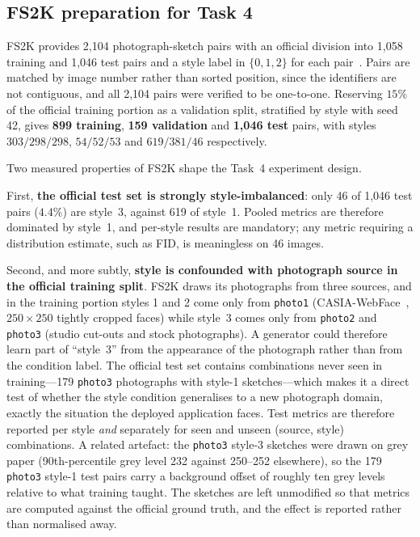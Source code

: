 \documentclass[conference]{IEEEtran}
\begin{document}
\subsection{FS2K preparation for Task 4}
\label{sec:fs2kprep}

FS2K provides 2{,}104 photograph-sketch pairs with an official division into
1{,}058 training and 1{,}046 test pairs and a style label in $\{0,1,2\}$ for each
pair~\cite{fan2022facial}. Pairs are matched by image number rather than sorted
position, since the identifiers are not contiguous, and all 2{,}104 pairs were
verified to be one-to-one. Reserving $15\%$ of the official training portion as a
validation split, stratified by style with seed 42, gives \textbf{899 training},
\textbf{159 validation} and \textbf{1{,}046 test} pairs, with styles
$303/298/298$, $54/52/53$ and $619/381/46$ respectively.

Two measured properties of FS2K shape the Task~4 experiment design.

First, \textbf{the official test set is strongly style-imbalanced}: only 46 of
1{,}046 test pairs ($4.4\%$) are style~3, against 619 of style~1. Pooled metrics
are therefore dominated by style~1, and per-style results are mandatory; any
metric requiring a distribution estimate, such as FID, is meaningless on 46
images.

Second, and more subtly, \textbf{style is confounded with photograph source in
the official training split}. FS2K draws its photographs from three sources, and
in the training portion styles 1 and 2 come only from \texttt{photo1}
(CASIA-WebFace~\cite{yi2014learning}, $250 \times 250$ tightly cropped faces)
while style~3 comes only from \texttt{photo2} and \texttt{photo3} (studio
cut-outs and stock photographs). A generator could therefore learn part of
``style~3'' from the appearance of the photograph rather than from the condition
label. The official test set contains combinations never seen in training---179
\texttt{photo3} photographs with style-1 sketches---which makes it a direct test
of whether the style condition generalises to a new photograph domain, exactly
the situation the deployed application faces. Test metrics are therefore
reported per style \emph{and} separately for seen and unseen (source, style)
combinations. A related artefact: the \texttt{photo3} style-3 sketches were drawn
on grey paper (90th-percentile grey level 232 against 250--252 elsewhere), so the
179 \texttt{photo3} style-1 test pairs carry a background offset of roughly ten
grey levels relative to what training taught. The sketches are left unmodified so
that metrics are computed against the official ground truth, and the effect is
reported rather than normalised away.
\end{document}
